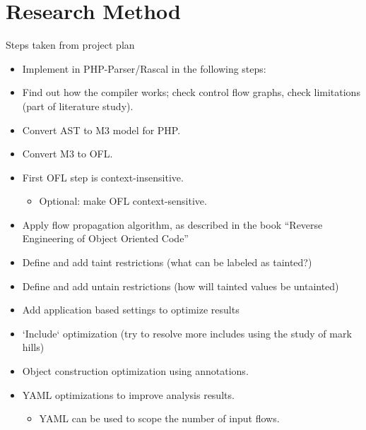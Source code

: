 \documentclass[../main.tex]{subfiles}
\begin{document}
    \chapter{Research Method}\label{chap:research_method}
    
    Steps taken from project plan
    \begin{itemize}[noitemsep,nolistsep]
        \item Implement in PHP-Parser/Rascal in the following steps:
        \item Find out how the compiler works; check control flow graphs, check limitations (part of literature study).
        \item Convert AST to M3 model for PHP.
        \item Convert M3 to OFL.
        \item First OFL step is context-insensitive.
        \begin{itemize}[noitemsep,nolistsep]
            \item Optional: make OFL context-sensitive.
        \end{itemize}
        \item Apply flow propagation algorithm, as described in the book “Reverse Engineering of Object Oriented Code”
        \item Define and add taint restrictions (what can be labeled as tainted?)
        \item Define and add untain restrictions (how will tainted values be untainted)
        \item Add application based settings to optimize results
        \item `Include` optimization (try to resolve more includes using the study of mark hills)
        \item Object construction optimization using annotations.
        \item YAML optimizations to improve analysis results.
        \begin{itemize}[noitemsep,nolistsep]
            \item YAML can be used to scope the number of input flows.
        \end{itemize}

\end{itemize}
\end{document}
